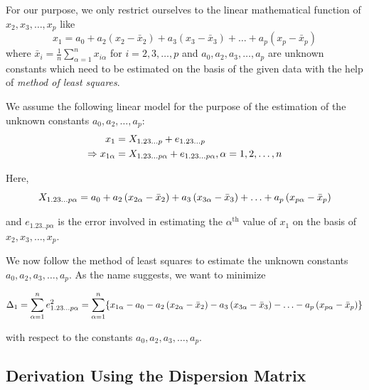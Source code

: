 \documentclass[10pt]{article}
\begin{document}
For our purpose, we only restrict ourselves to the linear mathematical function of $ x_2, x_3, \ldots, x_p $ like 
\begin{equation} 
x_1 = a_0 + a_2 \left( x_2 - \bar{x}_2 \right) + a_3 \left( x_3 - \bar{x}_3 \right) + \dots + a_p \left( x_p - \bar{x}_p \right)
\end{equation} 
where $ \bar{x}_i = \frac{ 1 }{ n } \sum_{\alpha = 1}^n x_{i\alpha} $ for $ i = 2, 3, \ldots, p $ and $ a_0, a_2, a_3, \ldots, a_p $ are unknown
constants which need to be estimated on the basis of the given data with the help of \textit{method of least squares}.

\begin{definition}
We assume the following linear model for the purpose of the estimation of the unknown constants $ a_0, a_2, \ldots, a_p $:
\begin{align}
	x_1 &= X_{1.23\dots p} + e_{1.23\dots p} \\
	\Rightarrow x_{1\alpha} &= X_{1.23\dots p\alpha} + e_{1.23\dots p\alpha}, \alpha = 1, 2, \ldots, n
\end{align}

Here, 
\begin{equation}
	X_{1.23\dots p\alpha} = a_0 + a_2 \left( x_{2\alpha} - \bar{x}_2 \right) + a_3 \left( x_{3\alpha} - \bar{x}_3 \right) + \ldots + a_p \left( x_{p\alpha} - \bar{x}_p \right) 
\end{equation}

and $ e_{1.23..p\alpha} $ is the error involved in estimating the $ \alpha ^{\text{th}} $ value of $ x_1 $ on the basis of $ x_2, x_3, \ldots, x_p $.
\end{definition}

We now follow the method of least squares to estimate the unknown constants $ a_0, a_2, a_3, \ldots, a_p $.
As the name suggests, we want to minimize

\begin{equation}
	\Delta_1 = \sum_{\alpha = 1}^{n} e_{1.23\dots p\alpha}^{2} = \sum_{\alpha = 1}^{n} \{ x_{1\alpha} - a_0 - a_2 \left( x_{2\alpha} - \bar{x}_2 \right) - a_3 \left( x_{3\alpha} - \bar{x}_3 \right) - \ldots - a_p \left( x_{p\alpha} - \bar{x}_p \right) \}
\end{equation}

with respect to the constants $ a_0, a_2, a_3, \ldots, a_p $.

\subsection{Derivation Using the Dispersion Matrix}
\end{document}

